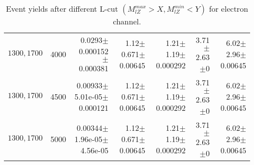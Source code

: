 \documentclass[]{article}
\begin{document}
\begin{table}
\begin{center}
{\begin{tabular}{ |r|r|r|r|r|r|r|}
$1300, 1700$ & 4000 & 0.0293$\pm$0.000152$\pm$0.000381 & 1.12$\pm$0.671$\pm$0.00645 & 1.21$\pm$1.19$\pm$0.000292 & 3.71$\pm$2.63$\pm$0 & 6.02$\pm$2.96$\pm$0.00645 \\
$1300, 1700$ & 4500 & 0.00933$\pm$5.01e-05$\pm$0.000121 & 1.12$\pm$0.671$\pm$0.00645 & 1.21$\pm$1.19$\pm$0.000292 & 3.71$\pm$2.63$\pm$0 & 6.02$\pm$2.96$\pm$0.00645 \\
$1300, 1700$ & 5000 & 0.00344$\pm$1.96e-05$\pm$4.56e-05 & 1.12$\pm$0.671$\pm$0.00645 & 1.21$\pm$1.19$\pm$0.000292 & 3.71$\pm$2.63$\pm$0 & 6.02$\pm$2.96$\pm$0.00645 \\
\hline 
\end{tabular}
}
\end{center}
\caption{Event yields after different L-cut $(M_{lZ}^{max} > X, M_{lZ}^{min} < Y)$ for electron channel.}
\end{table}
\end{document}
